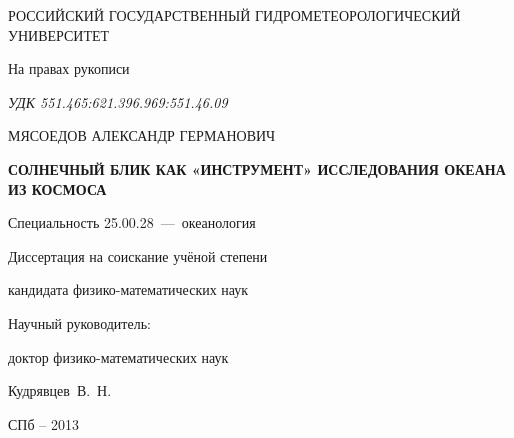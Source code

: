 \thispagestyle{empty}

\begin{center}
РОССИЙСКИЙ ГОСУДАРСТВЕННЫЙ ГИДРОМЕТЕОРОЛОГИЧЕСКИЙ УНИВЕРСИТЕТ\par
\par 
\par
\end{center}

\vspace{20mm}
\begin{flushright}
На правах рукописи

{\sl УДК 551.465:621.396.969:551.46.09}

\end{flushright}

\vspace{30mm}
\begin{center}
{\large МЯСОЕДОВ АЛЕКСАНДР ГЕРМАНОВИЧ}
\end{center}

\vspace{5mm}
\begin{center}
{\bf \large СОЛНЕЧНЫЙ БЛИК КАК «ИНСТРУМЕНТ» ИССЛЕДОВАНИЯ ОКЕАНА ИЗ КОСМОСА
\par}

\vspace{10mm}
{%
Специальность 25.00.28~---~океанология
}

\vspace{10mm}
Диссертация на соискание учёной степени

кандидата физико-математических наук
\end{center}

\vspace{20mm}
\begin{flushright}
Научный руководитель:

доктор физико-математических наук

Кудрявцев~В.~Н.

\end{flushright}

\vspace{20mm}
\begin{center}
{СПб -- 2013}
\end{center}

\newpage